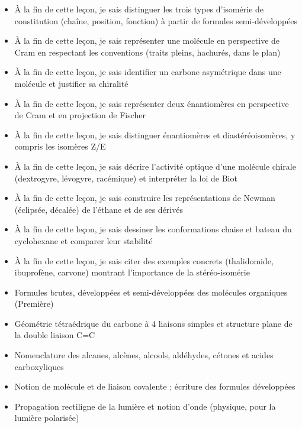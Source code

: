 \documentclass[11pt]{article}
\begin{document}
\begin{objectifs}
\begin{itemize}
\item À la fin de cette leçon, je sais distinguer les trois types d'isomérie de constitution (chaîne, position, fonction) à partir de formules semi-développées
\item À la fin de cette leçon, je sais représenter une molécule en perspective de Cram en respectant les conventions (traits pleins, hachurés, dans le plan)
\item À la fin de cette leçon, je sais identifier un carbone asymétrique dans une molécule et justifier sa chiralité
\item À la fin de cette leçon, je sais représenter deux énantiomères en perspective de Cram et en projection de Fischer
\item À la fin de cette leçon, je sais distinguer énantiomères et diastéréoisomères, y compris les isomères Z/E
\item À la fin de cette leçon, je sais décrire l'activité optique d'une molécule chirale (dextrogyre, lévogyre, racémique) et interpréter la loi de Biot
\item À la fin de cette leçon, je sais construire les représentations de Newman (éclipsée, décalée) de l'éthane et de ses dérivés
\item À la fin de cette leçon, je sais dessiner les conformations chaise et bateau du cyclohexane et comparer leur stabilité
\item À la fin de cette leçon, je sais citer des exemples concrets (thalidomide, ibuprofène, carvone) montrant l'importance de la stéréo-isomérie
\end{itemize}
\end{objectifs}

\begin{prerequis}
\begin{itemize}
\item Formules brutes, développées et semi-développées des molécules organiques (Première)
\item Géométrie tétraédrique du carbone à 4 liaisons simples et structure plane de la double liaison C=C
\item Nomenclature des alcanes, alcènes, alcools, aldéhydes, cétones et acides carboxyliques
\item Notion de molécule et de liaison covalente ; écriture des formules développées
\item Propagation rectiligne de la lumière et notion d'onde (physique, pour la lumière polarisée)
\end{itemize}
\end{prerequis}
\end{document}
